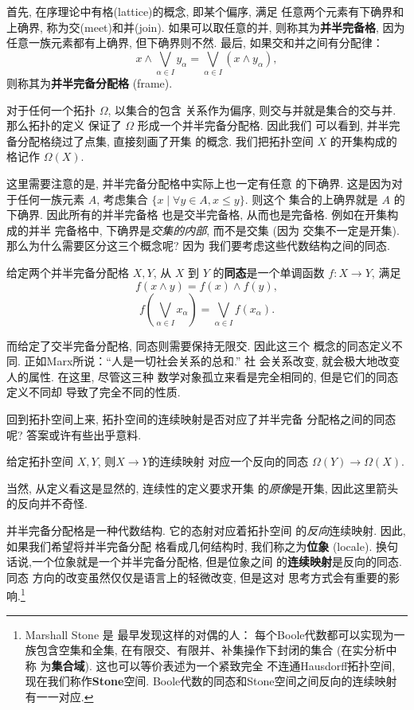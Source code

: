 首先, 在序理论中有格(lattice)的概念, 即某个偏序, 满足
任意两个元素有下确界和上确界, 称为交(meet)和并(join).
如果可以取任意的并, 则称其为\textbf{并半完备格},
因为任意一族元素都有上确界, 但下确界则不然.
最后, 如果交和并之间有分配律：
\[x \wedge \bigvee_{\alpha \in I} y_\alpha
= \bigvee_{\alpha \in I} (x \wedge y_\alpha),\]
则称其为\textbf{并半完备分配格} (frame).

对于任何一个拓扑 \(\Omega\), 以集合的包含
关系作为偏序, 则交与并就是集合的交与并. 那么拓扑的定义
保证了 \(\Omega\) 形成一个并半完备分配格. 因此我们
可以看到, 并半完备分配格绕过了点集, 直接刻画了开集
的概念. 我们把拓扑空间 \(X\) 的开集构成的格记作 \(\Omega(X)\).

这里需要注意的是, 并半完备分配格中实际上也一定有任意
的下确界. 这是因为对于任何一族元素 \(A\), 考虑集合
\(\{x \mid \forall y \in A, x \le y\}\). 则这个
集合的上确界就是 \(A\) 的下确界. 因此所有的并半完备格
也是交半完备格, 从而也是完备格. 例如在开集构成的并半
完备格中, 下确界是\emph{交集的内部}, 而不是交集 (因为
交集不一定是开集). 那么为什么需要区分这三个概念呢? 因为
我们要考虑这些代数结构之间的同态.

\begin{definition}
给定两个并半完备分配格 \(X, Y\), 从 \(X\) 到 \(Y\)
的\textbf{同态}是一个单调函数 \(f : X \to Y\), 满足
\[f(x\wedge y) = f(x) \wedge f(y),\]
\[f\left(\bigvee_{\alpha \in I} x_\alpha\right)
= \bigvee_{\alpha \in I} f(x_\alpha).\]
\end{definition}

而给定了交半完备分配格, 同态则需要保持无限交. 因此这三个
概念的同态定义不同. 正如Marx所说：“人是一切社会关系的总和.” 社
会关系改变, 就会极大地改变人的属性. 在这里, 尽管这三种
数学对象孤立来看是完全相同的, 但是它们的同态定义不同却
导致了完全不同的性质.

回到拓扑空间上来, 拓扑空间的连续映射是否对应了并半完备
分配格之间的同态呢? 答案或许有些出乎意料.
\begin{theorem}
给定拓扑空间 \(X, Y\), 则\(X \to Y\)的连续映射
对应一个反向的同态 \(\Omega(Y) \to \Omega(X)\).
\end{theorem}
当然, 从定义看这是显然的, 连续性的定义要求开集
的\emph{原像}是开集, 因此这里箭头的反向并不奇怪.

并半完备分配格是一种代数结构. 它的态射对应着拓扑空间
的\emph{反向}连续映射. 因此, 如果我们希望将并半完备分配
格看成几何结构时, 我们称之为\textbf{位象} (locale).
换句话说,一个位象就是一个并半完备分配格, 但是位象之间
的\textbf{连续映射}是反向的同态. 同态
方向的改变虽然仅仅是语言上的轻微改变, 但是这对
思考方式会有重要的影响.\footnote{Marshall Stone 是
最早发现这样的对偶的人： 每个Boole代数都可以实现为一族包含空集和全集,
在有限交、有限并、补集操作下封闭的集合 (在实分析中称
为\textbf{集合域}). 这也可以等价表述为一个紧致完全
不连通Hausdorff拓扑空间, 现在我们称作\textbf{Stone}空间.
Boole代数的同态和Stone空间之间反向的连续映射有一一对应.}

